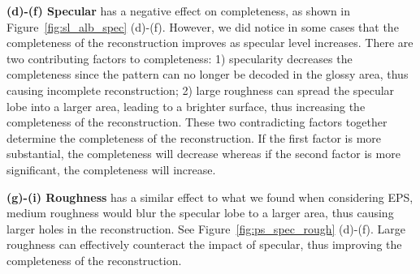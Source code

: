 \noindent\textbf{(d)-(f) Specular} has a negative effect on completeness, as shown in Figure~\ref{fig:sl_alb_spec} (d)-(f). However, we did notice in some cases that the completeness of the reconstruction improves as specular level increases. There are two contributing factors to completeness: 1) specularity decreases the completeness since the pattern can no longer be decoded in the glossy area, thus causing incomplete reconstruction; 2) large roughness can spread the specular lobe into a larger area, leading to a brighter surface, thus increasing the completeness of the reconstruction. These two contradicting factors together determine the completeness of the reconstruction. If the first factor is more substantial, the completeness will decrease whereas if the second factor is more significant, the completeness will increase.

\noindent\textbf{(g)-(i) Roughness} has a similar effect to what we found when considering EPS, \ie medium roughness would blur the specular lobe to a larger area, thus causing larger holes in the reconstruction. See Figure~\ref{fig:ps_spec_rough} (d)-(f). Large roughness can effectively counteract the impact of specular, thus improving the completeness of the reconstruction.


